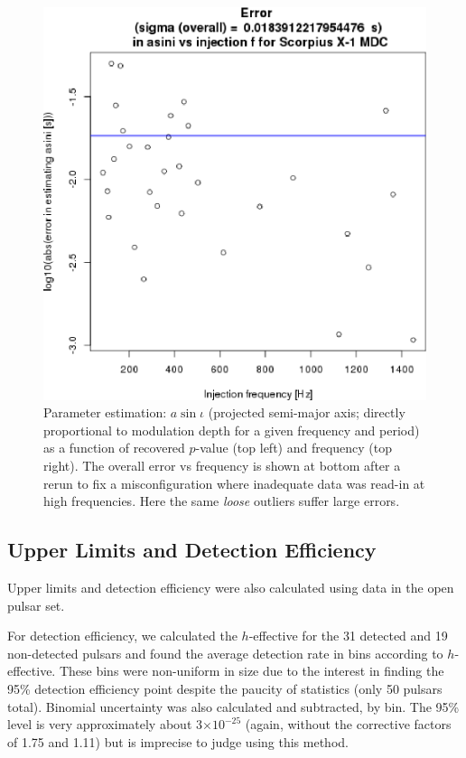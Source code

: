 \begin{figure}
\begin{center}
\includegraphics[width=0.6\paperwidth,height=0.4\paperheight]{plots/ErrorAsinivsF-overall.eps}
\caption{Parameter estimation: $a \sin\iota$ (projected semi-major axis; directly proportional to modulation depth for a given frequency and period) as a function of recovered $p$-value (top left) and frequency (top right). The overall error vs frequency is shown at bottom after a rerun to fix a misconfiguration where inadequate data was read-in at high frequencies.
Here the same \textit{loose} outliers suffer large errors.
\label{fig:errorasini}}
\end{center}
\end{figure}


\subsection{Upper Limits and Detection Efficiency}

Upper limits and detection efficiency were also calculated using data in the open pulsar set.

For detection efficiency, we calculated the $h$-effective for the 31 detected and 19 non-detected pulsars and found the average detection rate in bins according to $h$-effective. These bins were non-uniform in size due to the interest in finding the 95\% detection efficiency point despite the paucity of statistics (only 50 pulsars total). Binomial uncertainty was also calculated and subtracted, by bin. The 95\% level is very approximately about 3$\times 10^{-25}$ (again, without the corrective factors of 1.75 and 1.11) but is imprecise to judge using this method.

